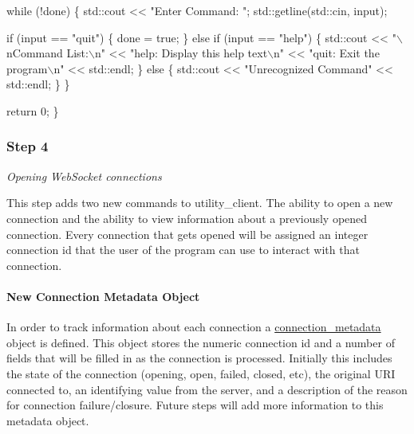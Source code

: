 \begin{DoxyCode}
    \textcolor{keywordflow}{while} (!done) \{
        std::cout << \textcolor{stringliteral}{"Enter Command: "};
        std::getline(std::cin, input);

        \textcolor{keywordflow}{if} (input == \textcolor{stringliteral}{"quit"}) \{
            done = \textcolor{keyword}{true};
        \} \textcolor{keywordflow}{else} \textcolor{keywordflow}{if} (input == \textcolor{stringliteral}{"help"}) \{
            std::cout
                << \textcolor{stringliteral}{"\(\backslash\)nCommand List:\(\backslash\)n"}
                << \textcolor{stringliteral}{"help: Display this help text\(\backslash\)n"}
                << \textcolor{stringliteral}{"quit: Exit the program\(\backslash\)n"}
                << std::endl;
        \} \textcolor{keywordflow}{else} \{
            std::cout << \textcolor{stringliteral}{"Unrecognized Command"} << std::endl;
        \}
    \}

    \textcolor{keywordflow}{return} 0;
\}
\end{DoxyCode}


\subsubsection*{Step 4}

{\itshape Opening Web\+Socket connections}

This step adds two new commands to utility\+\_\+client. The ability to open a new connection and the ability to view information about a previously opened connection. Every connection that gets opened will be assigned an integer connection id that the user of the program can use to interact with that connection.

\paragraph*{New Connection Metadata Object}

In order to track information about each connection a {\ttfamily \mbox{\hyperlink{classconnection__metadata}{connection\+\_\+metadata}}} object is defined. This object stores the numeric connection id and a number of fields that will be filled in as the connection is processed. Initially this includes the state of the connection (opening, open, failed, closed, etc), the original U\+RI connected to, an identifying value from the server, and a description of the reason for connection failure/closure. Future steps will add more information to this metadata object.

